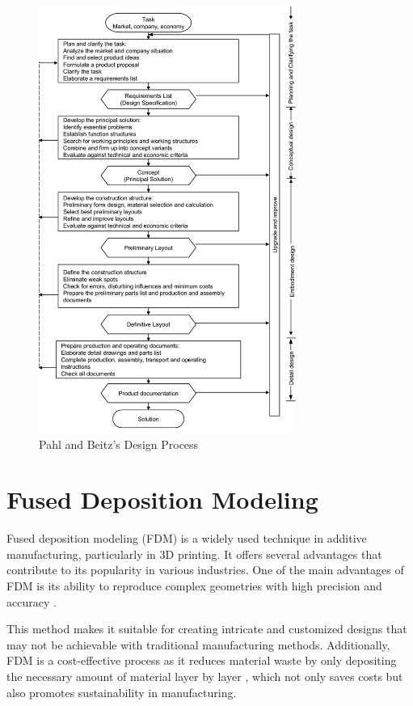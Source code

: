 \begin{figure}[ht!]
    \centering
    \includegraphics[width=0.75\textwidth]{texs/Part1/chapter1/image/pahlprocess.png}
    \caption{Pahl and Beitz's Design Process \cite[130]{Pahl2007}}
    \label{fig:pahlprocess}
\end{figure}

\section{Fused Deposition Modeling}
\label{sec:fused_deposition_modeling}

Fused deposition modeling (FDM) is a widely used technique in additive manufacturing, particularly in 3D printing. It offers several advantages that contribute to its popularity in various industries. One of the main advantages of FDM is its ability to reproduce complex geometries with high precision and accuracy \cite{Gordeev18}.

This method makes it suitable for creating intricate and customized designs that may not be achievable with traditional manufacturing methods. Additionally, FDM is a cost-effective process as it reduces material waste by only depositing the necessary amount of material layer by layer \cite{Gordeev18}, which not only saves costs but also promotes sustainability in manufacturing.

